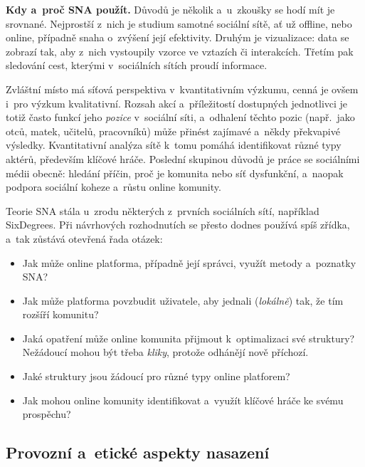 \documentclass[11pt,a4paper]{article}
\theoremstyle{definition}
\begin{document}
\textbf{Kdy a~proč SNA použít.} Důvodů je několik a~u~zkoušky se hodí mít je srovnané. Nejprostší
z~nich je studium samotné sociální sítě, ať už offline, nebo online, případně snaha o~zvýšení
její efektivity. Druhým je vizualizace: data se zobrazí tak, aby z~nich vystoupily vzorce ve
vztazích či interakcích. Třetím pak sledování cest, kterými v~sociálních sítích proudí informace.

Zvláštní místo má síťová perspektiva v~kvantitativním výzkumu, cenná je ovšem i~pro výzkum
kvalitativní. Rozsah akcí a~příležitostí dostupných jednotlivci je totiž často funkcí jeho
\emph{pozice} v~sociální síti, a~odhalení těchto pozic (např.\ jako otců, matek, učitelů,
pracovníků) může přinést zajímavé a~někdy překvapivé výsledky. Kvantitativní analýza sítě k~tomu
pomáhá identifikovat různé typy aktérů, především klíčové hráče. Poslední skupinou důvodů je
práce se sociálními médii obecně: hledání příčin, proč je komunita nebo síť dysfunkční, a~naopak
podpora sociální koheze a~růstu online komunity.

\begin{poznbox}
Teorie SNA stála u~zrodu některých z~prvních sociálních sítí, například SixDegrees. Při
návrhových rozhodnutích se přesto dodnes používá spíš zřídka, a~tak zůstává otevřená řada otázek:
\begin{itemize}
\item Jak může online platforma, případně její správci, využít metody a~poznatky SNA?
\item Jak může platforma povzbudit uživatele, aby jednali (\emph{lokálně}) tak, že tím
      rozšíří komunitu?
\item Jaká opatření může online komunita přijmout k~optimalizaci své struktury? Nežádoucí mohou
      být třeba \emph{kliky}, protože odhánějí nově příchozí.
\item Jaké struktury jsou žádoucí pro různé typy online platforem?
\item Jak mohou online komunity identifikovat a~využít klíčové hráče ke svému prospěchu?
\end{itemize}
\end{poznbox}

\subsection{Provozní a~etické aspekty nasazení}
\end{document}
